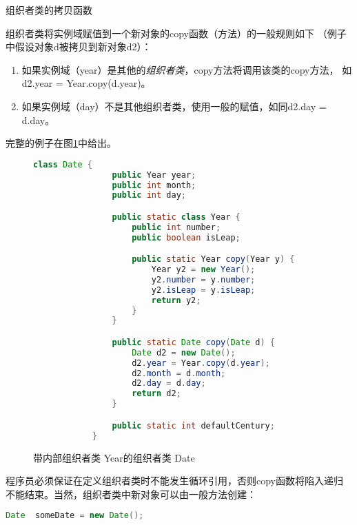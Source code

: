 \begin{definition}
    组织者类的拷贝函数

    组织者类将实例域赋值到一个新对象的copy函数（方法）的一般规则如下
    （例子中假设对象d被拷贝到新对象d2）：
    \begin{enumerate}
        \item 如果实例域（year）是其他的\emph{组织者类}，copy方法将调用该类的copy方法，
            如d2.year = Year.copy(d.year)。
        \item 如果实例域（day）不是其他组织者类，使用一般的赋值，如同d2.day = d.day。
    \end{enumerate}
    \noindent
    完整的例子在图\ref{Fig:OrgDataClasswithOrgYear}中给出。

     \begin{figure}
        \begin{lstlisting}[language={Java}, keywordstyle=\color{blue!70}, commentstyle=\color{red!50!green!50!blue!50}]
            class Date {
                public Year year;
                public int month;
                public int day;

                public static class Year {
                    public int number;
                    public boolean isLeap;

                    public static Year copy(Year y) {
                        Year y2 = new Year();
                        y2.number = y.number;
                        y2.isLeap = y.isLeap;
                        return y2;
                    }
                }

                public static Date copy(Date d) {
                    Date d2 = new Date();
                    d2.year = Year.copy(d.year);
                    d2.month = d.month;
                    d2.day = d.day;
                    return d2;
                }

                public static int defaultCentury;
            }
        \end{lstlisting}
        \caption{带内部组织者类 Year的组织者类 Date}\label{Fig:OrgDataClasswithOrgYear}
    \end{figure}
\end{definition}

程序员必须保证在定义组织者类时不能发生循环引用，否则copy函数将陷入递归
不能结束。当然，组织者类中新对象可以由一般方法创建：
\begin{lstlisting}[language={Java}, keywordstyle=\color{blue!70}, commentstyle=\color{red!50!green!50!blue!50}]
    Date  someDate = new Date();
\end{lstlisting}

